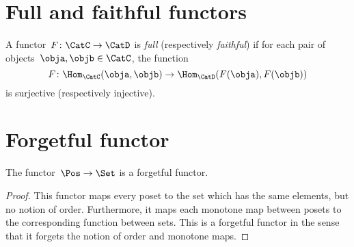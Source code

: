 \section{Full and faithful functors}
\begin{ctdefinition}
  \label{def:functorfullfaith}
  A functor~$F\colon \CatC \to \CatD$ is \emph{full} (respectively \emph{faithful}) if for each pair of objects~$\obja,\objb\in \CatC$, the function
  \begin{equation}
    F\colon \Hom_\CatC(\obja,\objb)\to \Hom_\CatD(F(\obja),F(\objb))
  \end{equation}
  is surjective (respectively injective).
\end{ctdefinition}


\section{Forgetful functor}

\begin{lemma}
  The functor~$\Pos \to \Set$ is a forgetful functor.
\end{lemma}
\begin{proof}
  This functor maps every poset to the set which has the same elements, but no notion of order. Furthermore, it maps each monotone map between posets to the corresponding function between sets. This is a forgetful functor in the sense that it forgets the notion of order and monotone maps.
\end{proof}

